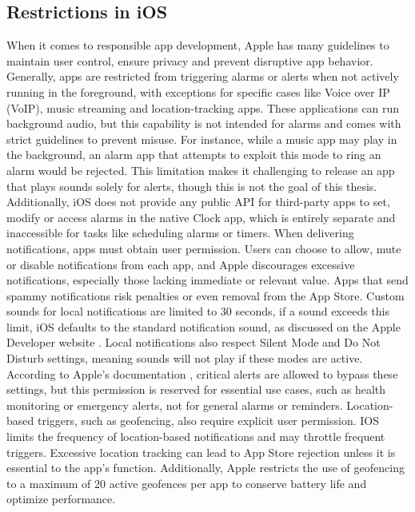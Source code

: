 \subsection{Restrictions in iOS}
When it comes to responsible app development, Apple has many guidelines to maintain user control, ensure privacy and prevent disruptive app behavior. 
Generally, apps are restricted from triggering alarms or alerts when not actively running in the foreground, with exceptions for specific cases like Voice over IP (VoIP), music streaming and location-tracking apps. 
These applications can run background audio, but this capability is not intended for alarms and comes with strict guidelines to prevent misuse. 
For instance, while a music app may play in the background, an alarm app that attempts to exploit this mode to ring an alarm would be rejected. 
This limitation makes it challenging to release an app that plays sounds solely for alerts, though this is not the goal of this thesis.
Additionally, iOS does not provide any public API for third-party apps to set, modify or access alarms in the native Clock app, which is entirely separate and inaccessible for tasks like scheduling alarms or timers. 
When delivering notifications, apps must obtain user permission. 
Users can choose to allow, mute or disable notifications from each app, and Apple discourages excessive notifications, especially those lacking immediate or relevant value. 
Apps that send spammy notifications risk penalties or even removal from the App Store. 
Custom sounds for local notifications are limited to 30 seconds, if a sound exceeds this limit, iOS defaults to the standard notification sound, as discussed on the Apple Developer website \cite{apple_sound_guidelines}.
Local notifications also respect Silent Mode and Do Not Disturb settings, meaning sounds will not play if these modes are active. 
According to Apple's documentation \cite{apple_critical_alerts}, critical alerts are allowed to bypass these settings, but this permission is reserved for essential use cases, such as health monitoring or emergency alerts, not for general alarms or reminders. 
Location-based triggers, such as geofencing, also require explicit user permission. 
IOS \cite{apple_geofencing_limits} limits the frequency of location-based notifications and may throttle frequent triggers. 
Excessive location tracking can lead to App Store rejection unless it is essential to the app's function. 
Additionally, Apple restricts the use of geofencing to a maximum of 20 active geofences per app to conserve battery life and optimize performance. 

